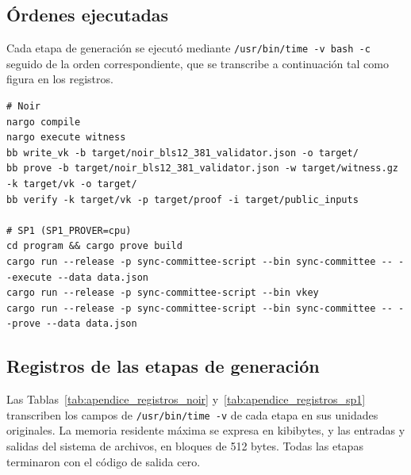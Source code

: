 \subsection{Órdenes ejecutadas}
\label{sec:apendice_ordenes}

Cada etapa de generación se ejecutó mediante \texttt{/usr/bin/time -v bash -c} seguido de la
orden correspondiente, que se transcribe a continuación tal como figura en los registros.

\begin{lstlisting}[basicstyle=\ttfamily\footnotesize, breaklines=true, columns=fullflexible]
# Noir
nargo compile
nargo execute witness
bb write_vk -b target/noir_bls12_381_validator.json -o target/
bb prove -b target/noir_bls12_381_validator.json -w target/witness.gz -k target/vk -o target/
bb verify -k target/vk -p target/proof -i target/public_inputs

# SP1 (SP1_PROVER=cpu)
cd program && cargo prove build
cargo run --release -p sync-committee-script --bin sync-committee -- --execute --data data.json
cargo run --release -p sync-committee-script --bin vkey
cargo run --release -p sync-committee-script --bin sync-committee -- --prove --data data.json
\end{lstlisting}

\subsection{Registros de las etapas de generación}
\label{sec:apendice_registros}

Las Tablas~\ref{tab:apendice_registros_noir} y~\ref{tab:apendice_registros_sp1} transcriben los
campos de \texttt{/usr/bin/time -v} de cada etapa en sus unidades originales. La memoria residente
máxima se expresa en kibibytes, y las entradas y salidas del sistema de archivos, en bloques de 512
bytes. Todas las etapas terminaron con el código de salida cero.

